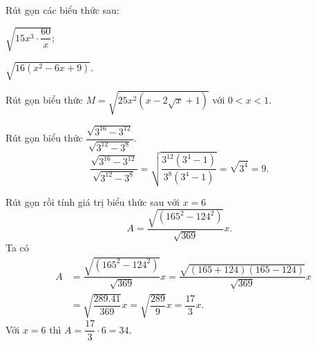 \begin{vd}%
	Rút gọn các biểu thức sau:
	\begin{listEX}[2]
	\item $\sqrt{15 x^3 \cdot \dfrac{60}{x}}$;
	\item $\sqrt{16 \left(x^2-6 x+9 \right)}$.
	\end{listEX}
\end{vd}
\begin{vd}%
	Rút gọn biểu thức $M=\sqrt{25 x^2\left(x-2 \sqrt{x}+1\right)}$ với $0<x<1$.
\end{vd}
\begin{vd}%
	Rút gọn biểu thức $\dfrac{\sqrt{3^{16} - 3^{12}}}{\sqrt{3^{12} - 3^8}}$.
	\loigiai
	{
	$$\dfrac{\sqrt{3^{16} - 3^{12}}}{\sqrt{3^{12} - 3^8}}=\sqrt{\dfrac{3^{12}\left(3^4 - 1\right)}{3^8\left(3^4 - 1\right)}}=\sqrt{3^4}= 9.$$
	}
\end{vd}
\begin{vd}%
	Rút gọn rồi tính giá trị biểu thức sau với $x=6$
	\[A =\dfrac{\sqrt{\left(165^2 - 124^2\right)}}{\sqrt{369}} x.\]
	\loigiai
	{Ta có
	\allowdisplaybreaks 
	\begin{eqnarray*}
	&A &=\dfrac{\sqrt{\left(165^2 - 124^2\right)}}{\sqrt{369}}x =\dfrac{\sqrt{(165 + 124)(165 - 124)}}{\sqrt{369}} x \\&&=\sqrt{\dfrac{289.41}{369}} x =\sqrt{\dfrac{289}{9}} x =\dfrac{17}{3}x.
	\end{eqnarray*}
	Với $x=6$ thì $A=\dfrac{17}{3}\cdot6=34.$
	}
\end{vd}
